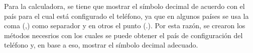 \begin{itemize}
Para la calculadora, se tiene que mostrar el símbolo decimal de acuerdo con el país para el cual está configurado el teléfono, ya que en algunos países se usa la coma (,) como separador y en otros el punto (.). Por esta razón, se crearon los métodos necesrios con los cuales se puede obtener el país de configuración del teléfono y, en base a eso, mostrar el símbolo decimal adecuado.

\end{itemize}
%
%
%
%
%
%
